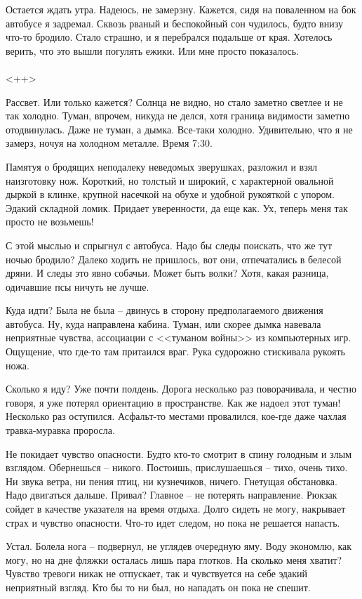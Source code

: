 \documentclass[a4paper]{book}
\begin{document}
Остается ждать утра. Надеюсь, не замерзну. Кажется, сидя на поваленном на бок автобусе я задремал. Сквозь рваный и беспокойный сон чудилось, будто внизу что-то бродило. Стало страшно, и я перебрался подальше от края. Хотелось верить, что это вышли погулять ежики. Или мне просто показалось. 
\paragraph{}<++>


Рассвет. Или только кажется? Солнца не видно, но стало заметно светлее и не так холодно. Туман, впрочем, никуда не делся, хотя граница видимости заметно отодвинулась. Даже не туман, а дымка. Все-таки холодно. Удивительно, что я не замерз, ночуя на холодном металле. Время 7:30. 

Памятуя о бродящих неподалеку неведомых зверушках, разложил и взял наизготовку нож. Короткий, но толстый и широкий, с характерной овальной дыркой в клинке, крупной насечкой на обухе и удобной рукояткой с упором. Эдакий складной ломик. Придает уверенности, да еще как. Ух, теперь меня так просто не возьмешь!

С этой мыслью и спрыгнул с автобуса. Надо бы следы поискать, что же тут ночью бродило? Далеко ходить не пришлось, вот они, отпечатались в белесой дряни. И следы это явно собачьи. Может быть волки? Хотя, какая разница, одичавшие псы ничуть не лучше. 

Куда идти? Была не была -- двинусь в сторону предполагаемого движения автобуса. Ну, куда направлена кабина. Туман, или скорее дымка навевала неприятные чувства, ассоциации с <<туманом войны>> из компьютерных игр. Ощущение, что где-то там притаился враг. Рука судорожно стискивала рукоять ножа.

Сколько я иду? Уже почти полдень. Дорога несколько раз поворачивала, и честно говоря, я уже потерял ориентацию в пространстве. Как же надоел этот туман! Несколько раз оступился. Асфальт-то местами провалился, кое-где даже чахлая травка-муравка проросла.

Не покидает чувство опасности. Будто кто-то смотрит в спину голодным и злым взглядом. Обернешься -- никого. Постоишь, прислушаешься -- тихо, очень тихо. Ни звука ветра, ни пения птиц, ни кузнечиков, ничего. Гнетущая обстановка. Надо двигаться дальше. Привал? Главное -- не потерять направление. Рюкзак сойдет в качестве указателя на время отдыха. Долго сидеть не могу, накрывает страх и чувство опасности. Что-то идет следом, но пока не решается напасть. 

Устал. Болела нога -- подвернул, не углядев очередную яму. Воду экономлю, как могу, но на дне фляжки осталась лишь пара глотков. На сколько меня хватит? Чувство тревоги никак не отпускает, так и чувствуется на себе эдакий неприятный взгляд. Кто бы то ни был, но нападать он пока не спешит.
\end{document}
